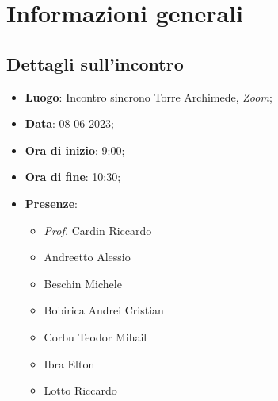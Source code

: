 \section{Informazioni generali}

\subsection{Dettagli sull'incontro}
\begin{itemize}
\item \textbf{Luogo}: Incontro sincrono Torre Archimede, \textit{Zoom\glo};
\item \textbf{Data}: 08-06-2023;
\item \textbf{Ora di inizio}: 9:00;
\item \textbf{Ora di fine}: 10:30;
\item \textbf{Presenze}: 
\begin{itemize}
    \item \textit{Prof.} Cardin Riccardo
	\item Andreetto Alessio
    \item Beschin Michele
    \item Bobirica Andrei Cristian
    \item Corbu Teodor Mihail
    \item Ibra Elton
    \item Lotto Riccardo 
\end{itemize}
\end{itemize}


